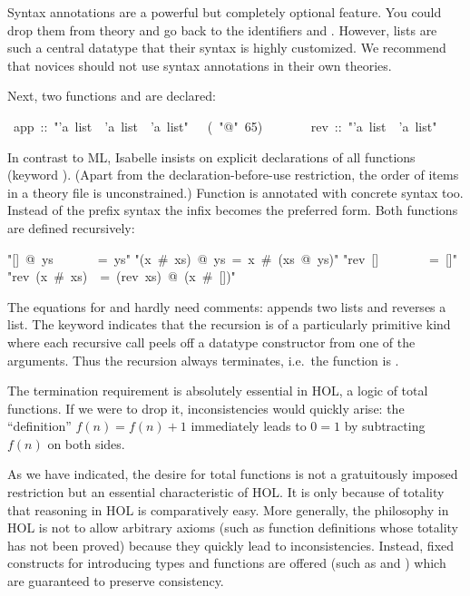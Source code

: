 \begin{isabelle}
\begin{isamarkuptext}
\begin{warn}
  Syntax annotations are a powerful but completely optional feature. You
  could drop them from theory  and go back to the identifiers
   and . However, lists are such a central datatype
  that their syntax is highly customized. We recommend that novices should
  not use syntax annotations in their own theories.
\end{warn}
Next, two functions  and  are declared:%
\end{isamarkuptext}%
~app~::~{"}'a~list~{\isasymRightarrow}~'a~list~{\isasymRightarrow}~'a~list{"}~~~(~{"}@{"}~65)\isanewline
~~~~~~~rev~::~{"}'a~list~{\isasymRightarrow}~'a~list{"}%
\begin{isamarkuptext}%
\noindent
In contrast to ML, Isabelle insists on explicit declarations of all functions
(keyword ).  (Apart from the declaration-before-use
restriction, the order of items in a theory file is unconstrained.) Function
 is annotated with concrete syntax too. Instead of the prefix
syntax  the infix
 becomes the preferred
form. Both functions are defined recursively:%
\end{isamarkuptext}%
\isanewline
{"}[]~@~ys~~~~~~~=~ys{"}\isanewline
{"}(x~\#~xs)~@~ys~=~x~\#~(xs~@~ys){"}\isanewline
\isanewline
{}\isanewline
{"}rev~[]~~~~~~~~=~[]{"}\isanewline
{"}rev~(x~\#~xs)~~=~(rev~xs)~@~(x~\#~[]){"}%
\begin{isamarkuptext}%
\noindent
The equations for  and  hardly need comments:
 appends two lists and  reverses a list.  The keyword
 indicates that the recursion is of a
particularly primitive kind where each recursive call peels off a datatype
constructor from one of the arguments.  Thus the
recursion always terminates, i.e.\ the function is .

The termination requirement is absolutely essential in HOL, a logic of total
functions. If we were to drop it, inconsistencies would quickly arise: the
``definition'' $f(n) = f(n)+1$ immediately leads to $0 = 1$ by subtracting
$f(n)$ on both sides.

\begin{warn}
  As we have indicated, the desire for total functions is not a gratuitously
  imposed restriction but an essential characteristic of HOL. It is only
  because of totality that reasoning in HOL is comparatively easy.  More
  generally, the philosophy in HOL is not to allow arbitrary axioms (such as
  function definitions whose totality has not been proved) because they
  quickly lead to inconsistencies. Instead, fixed constructs for introducing
  types and functions are offered (such as  and
  ) which are guaranteed to preserve consistency.
\end{warn}


\end{isamarkuptext}
\end{isabelle}
